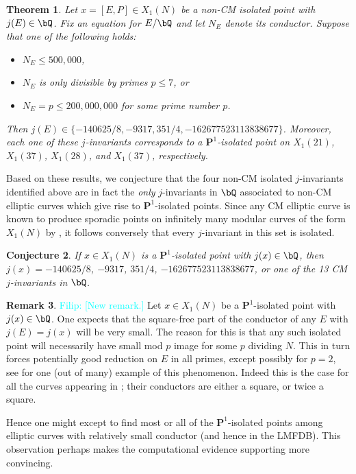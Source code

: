 \documentclass[11pt,reqno]{amsart}
\theoremstyle{plain}
\newtheorem{theorem}{Theorem}%
\newtheorem{conjecture}[theorem]{Conjecture}
\theoremstyle{definition}
\newtheorem{remark}[theorem]{Remark}
\newcommand{\Q}{\bQ}
\newcommand{\PP}{\mathbf P}
\newcommand{\filip}[1]{{\textcolor{cyan}{Filip: [#1]}}}
\begin{document}
\begin{theorem}\label{LMFDBoutputThm}
Let $x=[E,P]\in X_1(N)$ be a non-CM isolated point with $j(E) \in \Q$.
Fix an equation for $E/\Q$ and let $N_E$ denote its conductor.
Suppose that one of the following holds:
\begin{itemize}
    \item $N_E \leq 500{,}000$,
    \item $N_E$ is only divisible by primes $p \leq 7$, or
    \item $N_E=p \leq 200{,}000{,}000$ for some prime number $p$.
\end{itemize}
Then $j(E) \in \{-140625/8,-9317,351/4, -162677523113838677\}$. Moreover, each one of these $j$-invariants corresponds to a $\PP^1$-isolated point on $X_1(21)$, $X_1(37)$, $X_1(28)$, and $X_1(37)$, respectively.
\end{theorem}

Based on these results, we conjecture that the four non-CM isolated $j$-invariants identified above are in fact the \emph{only} $j$-invariants in $\Q$ associated to non-CM elliptic curves which give rise to $\PP^1$-isolated points. Since any CM elliptic curve is known to produce sporadic points on infinitely many modular curves of the form $X_1(N)$ by \cite[Theorem 7.1]{BELOV}, it follows conversely that every $j$-invariant in this set is isolated.
 

\begin{conjecture}\label{conj}
If $x\in X_1(N)$ is a $\PP^1$-isolated point with $j(x) \in \Q$, then $j(x)=-140625/8$, $-9317$, $351/4$, $-162677523113838677$, or one of the 13 CM $j$-invariants in $\Q$.
\end{conjecture}
\begin{remark}
\filip{New remark.}
Let $x\in X_1(N)$ be a $\PP^1$-isolated point with $j(x) \in \Q$. One expects that the square-free part of the conductor of any $E$ with $j(E)=j(x)$ will be very small.  The reason for this is that any such isolated point will necessarily have small mod $p$ image for some $p$ dividing $N$. This in turn forces potentially good reduction on $E$ in all primes, except possibly for $p=2$, see \cite[Corollary 4.4]{Mazur1978} for one (out of many) example of this phenomenon. Indeed this is the case for all the curves appearing in ; their conductors are either a square, or twice a square. 

Hence one might except to find most or all of the $\PP^1$-isolated points among elliptic curves with relatively small conductor (and hence in the LMFDB). This observation perhaps makes the computational evidence supporting  more convincing. 
\end{remark}
\end{document}
